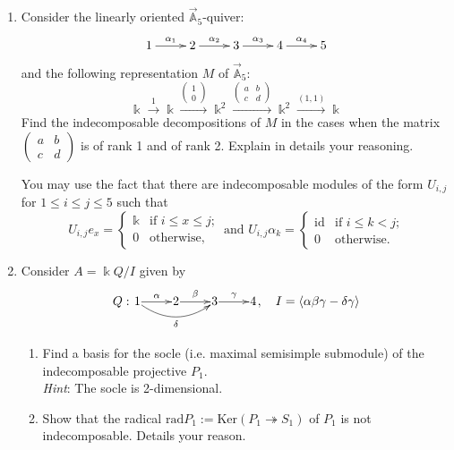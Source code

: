 \documentclass[12pt]{article}
\begin{document}
\begin{question}
\begin{enumerate}
\item Consider the linearly oriented $\vec{\mathbb{A}}_5$-quiver:
\[
\xymatrix{ 1 \ar[r]^{\alpha_1} & 2 \ar[r]^{\alpha_2} & 3 \ar[r]^{\alpha_3} & 4 \ar[r]^{\alpha_4} & 5}
\]
and the following representation $M$ of $\vec{\mathbb{A}}_5$:
\[
\Bbbk \xrightarrow{1} \Bbbk \xrightarrow{\left(\begin{smallmatrix}1\\0\end{smallmatrix}\right)} \Bbbk^2 \xrightarrow{\left(\begin{smallmatrix}a&b\\c&d\end{smallmatrix}\right)} \Bbbk^2 \xrightarrow{(1,1)} \Bbbk 
\]
Find the indecomposable decompositions of $M$ in the cases when the matrix $\left(\begin{smallmatrix}a&b\\c&d\end{smallmatrix}\right)$ is of rank 1 and of rank 2.
Explain in details your reasoning.

You may use the fact that there are indecomposable modules of the form $U_{i,j}$ for $1\leq i\leq j\leq 5$ such that
\[
U_{i,j}e_x = \begin{cases}
\Bbbk & \text{if  $i\leq x\leq j$;}\\
0 & \text{otherwise,}
\end{cases} \text{ and } U_{i,j}\alpha_k = \begin{cases}
\mathrm{id} & \text{if $i\leq k<j$;}\\
0 & \text{otherwise.}
\end{cases}
\]

\item Consider $A=\Bbbk Q/I$ given by
\[
Q: \xymatrix@1{1 \ar[r]^{\alpha}\ar@/_1pc/[rr]_{\delta}& 2 \ar[r]^{\beta}& 3 \ar[r]^{\gamma}& 4}, \quad I=\langle \alpha\beta\gamma-\delta\gamma\rangle 
\]

\begin{enumerate}
\item Find a basis for the socle (i.e. maximal semisimple submodule) of the indecomposable projective $P_1$.\\
\emph{Hint}: The socle is 2-dimensional.

\item Show that the radical $\mathrm{rad}P_1:=\mathrm{Ker}(P_1\twoheadrightarrow S_1)$ of $P_1$ is not indecomposable.  Details your reason.
\end{enumerate}

\end{enumerate}
\end{question}
\end{document}

